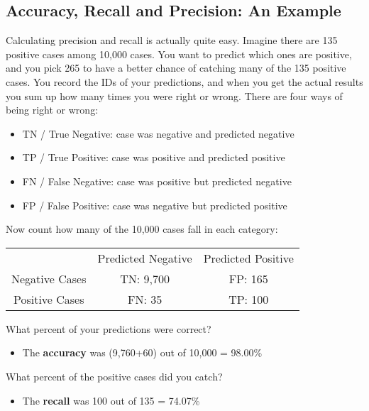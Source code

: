 \documentclass[a4paper,12pt]{article}
\begin{document}
\subsection{Accuracy, Recall and Precision: An Example}
Calculating precision and recall is actually quite easy. Imagine there are 135 positive cases among 10,000 cases. You want to predict which ones are positive, and you pick 265 to have a better chance of catching many of the 135 positive cases.  You record the IDs of your predictions, and when you get the actual results you sum up how many times you were right or wrong. There are four ways of being right or wrong:

\begin{itemize}
\item TN / True Negative: case was negative and predicted negative
\item TP / True Positive: case was positive and predicted positive
\item FN / False Negative: case was positive but predicted negative
\item FP / False Positive: case was negative but predicted positive
\end{itemize}

Now count how many of the 10,000 cases fall in each category:
\begin{center}
\begin{tabular}{|c|c|c|}
  \hline
&Predicted Negative & Predicted Positive\\
Negative Cases & TN: 9,700 & FP: 165 \\
Positive Cases & FN: 35 & TP: 100 \\

  \hline
\end{tabular}
\end{center}


What percent of your predictions were correct?

\begin{itemize}
\item The \textbf{accuracy} was (9,760+60) out of 10,000 = 98.00\%
\end{itemize}

What percent of the positive cases did you catch?

\begin{itemize}
\item The \textbf{recall} was 100 out of 135 = 74.07\%
\end{itemize}
\end{document}

